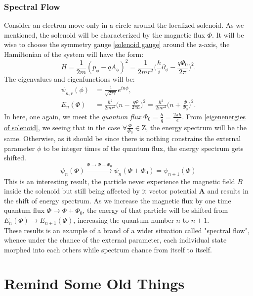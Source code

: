\documentclass[unnumsec,webpdf,modern,large]{mam-authoring-template}%
\theoremstyle{thmstyleone}%
\theoremstyle{thmstyletwo}%
\theoremstyle{thmstylethree}%
\begin{document}
\begin{appendices}
\subsubsection{Spectral Flow}
Consider an electron move only in a circle around the localized solenoid. As we mentioned, the solenoid will be characterized by the magnetic flux \(\Phi\). It will be wise to choose the symmetry gauge \eqref{solenoid gauge} around the z-axis, the Hamiltonian of the system will have the form:
\begin{equation}
	H = \frac{1}{2m}(p_{\phi} - qA_\phi)^2=\frac{1}{2mr^2} \bigg(\frac{\hbar}{i} \partial_{\phi} - \frac{q\Phi_0}{2\pi}\bigg)^2.
\end{equation}
\quad The eigenvalues and eigenfunctions will be:
\begin{align}
	\psi_{n,r}(\phi) &= \frac{1}{\sqrt{2\pi r}}e^{in\phi},\\\label{eigenenergies of solenoid}
	E_n(\Phi) &= \frac{\hbar^2}{2mr^2} \bigg(n - \frac{q\Phi}{2\pi \hbar}\bigg)^2= \frac{\hbar^2}{2mr^2} \bigg(n + \frac{\Phi}{\Phi_0}\bigg)^2.
\end{align}
\quad In here, one again, we meet the \textit{quantum flux} \(\Phi_0 = \frac{h}{q} = \frac{2\pi \hbar}{e}\). From \eqref{eigenenergies of solenoid}, we seeing that in the case \(\forall \frac{\Phi}{\Phi_0} \in \mathrm{Z}\), the energy spectrum will be the same. Otherwise, as it should be since there is nothing constrains the external parameter \(\phi\) to be integer times of the quantum flux, the energy spectrum gets shifted.
\begin{equation*}
	\psi_n(\Phi) \xrightarrow{\Phi \to \Phi+\Phi_0} \psi_n(\Phi+\Phi_0) = \psi_{n+1} (\Phi)
\end{equation*}
\quad This is an interesting result, the particle never experience the magnetic field \(B\) inside the solenoid but still being affected by it vector potential \(\textbf{A}\) and results in the shift of energy spectrum. As we increase the magnetic flux by one time quantum flux \(\Phi \to \Phi + \Phi_0\), the energy of that particle will be shifted from \(E_n (\Phi) \to E_{n+1} (\Phi)\), increasing the quantum number \(n\) to \(n+1\).\\\null
\quad These results is an example of a brand of a wider situation called "spectral flow", whence under the chance of the external parameter, each individual state morphed into each others while spectrum chance from itself to itself.
\section{Remind Some Old Things}

\end{appendices}
\end{document}
